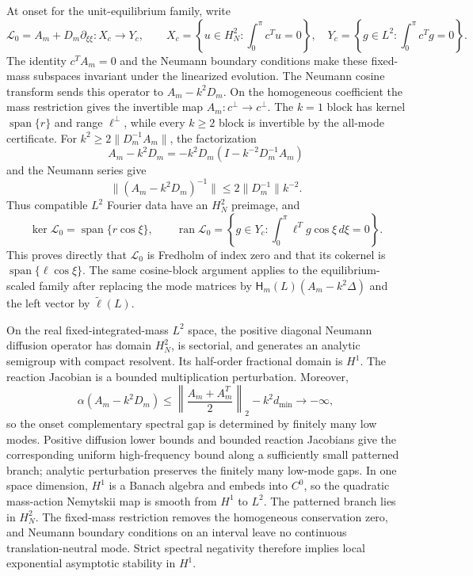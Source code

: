 \documentclass[10pt]{article}
\newcommand{\1}{\mathbf1}
\begin{document}
At onset for the unit-equilibrium family, write
\[
 \mathcal L_0=A_m+D_m\partial_{\xi\xi}:X_c\longrightarrow Y_c,
 \qquad
 X_c=\left\{u\in H_N^2:\int_0^\pi c^Tu=0\right\},\quad
 Y_c=\left\{g\in L^2:\int_0^\pi c^Tg=0\right\}.
\]
The identity $c^TA_m=0$ and the Neumann boundary conditions make these
fixed-mass subspaces invariant under the linearized evolution.
The Neumann cosine transform sends this operator to
$A_m-k^2D_m$.  On the homogeneous coefficient the mass restriction gives the
invertible map $A_m:c^\perp\to c^\perp$.  The $k=1$ block has kernel
$\operatorname{span}\{r\}$ and range $\ell^\perp$, while every $k\ge2$ block
is invertible by the all-mode certificate.  For
$k^2\ge2\|D_m^{-1}A_m\|$, the factorization
\[
 A_m-k^2D_m=-k^2D_m(I-k^{-2}D_m^{-1}A_m)
\]
and the Neumann series give
\[
 \|(A_m-k^2D_m)^{-1}\|
 \le 2\|D_m^{-1}\|k^{-2}.
\]
Thus compatible $L^2$ Fourier data have an $H_N^2$ preimage, and
\[
 \ker\mathcal L_0=\operatorname{span}\{r\cos\xi\},\qquad
 \operatorname{ran}\mathcal L_0
 =\left\{g\in Y_c:\int_0^\pi\ell^Tg\cos\xi\,d\xi=0\right\}.
\]
This proves directly that $\mathcal L_0$ is Fredholm of index zero and that
its cokernel is $\operatorname{span}\{\ell\cos\xi\}$.  The same cosine-block
argument applies to the equilibrium-scaled family after replacing the mode
matrices by $\mathsf H_m(L)(A_m-k^2\Delta)$ and the left vector by
$\widetilde\ell(L)$.

On the real fixed-integrated-mass $L^2$ space, the positive diagonal Neumann
diffusion operator has domain $H_N^2$, is sectorial, and generates an analytic
semigroup with compact resolvent.  Its half-order fractional domain is $H^1$.
The reaction Jacobian is a bounded multiplication perturbation.  Moreover,
\[
 \alpha(A_m-k^2D_m)
 \le\left\|\frac{A_m+A_m^T}{2}\right\|_2-k^2d_{\min}\to-\infty,
\]
so the onset complementary spectral gap is determined by finitely many low
modes.  Positive diffusion lower bounds and bounded reaction Jacobians give
the corresponding uniform high-frequency bound along a sufficiently small
patterned branch; analytic perturbation preserves the finitely many low-mode
gaps.  In one space
dimension, $H^1$ is a Banach algebra and embeds into $C^0$, so the quadratic
mass-action Nemytskii map is smooth from $H^1$ to $L^2$.  The patterned branch
lies in $H_N^2$.  The fixed-mass restriction removes the homogeneous
conservation zero, and Neumann boundary conditions on an interval leave no
continuous translation-neutral mode.  Strict spectral negativity therefore
implies local exponential asymptotic stability in $H^1$.
\end{document}
